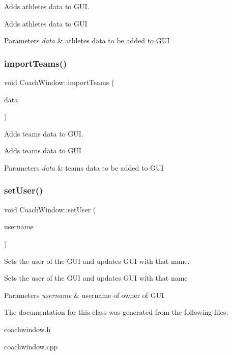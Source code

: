 Adds athletes data to G\+UI. 

Adds athletes data to G\+UI 
\begin{DoxyParams}{Parameters}
{\em data} & athletes data to be added to G\+UI \\
\hline
\end{DoxyParams}
\mbox{\label{classCoachWindow_af20eff5e696065c76f801f1aacea6322}} 
\subsubsection{\texorpdfstring{importTeams()}{importTeams()}}
{\footnotesize\ttfamily void Coach\+Window\+::import\+Teams (\begin{DoxyParamCaption}\item[{\mbox{\hyperlink{classTeamsDataContainer}{Teams\+Data\+Container}}}]{data }\end{DoxyParamCaption})}



Adds teams data to G\+UI. 

Adds teams data to G\+UI 
\begin{DoxyParams}{Parameters}
{\em data} & teams data to be added to G\+UI \\
\hline
\end{DoxyParams}
\mbox{\label{classCoachWindow_ac711fc6e1ae0ec1f53331faa6f3e2918}} 
\subsubsection{\texorpdfstring{setUser()}{setUser()}}
{\footnotesize\ttfamily void Coach\+Window\+::set\+User (\begin{DoxyParamCaption}\item[{std\+::string}]{username }\end{DoxyParamCaption})}



Sets the user of the G\+UI and updates G\+UI with that name. 

Sets the user of the G\+UI and updates G\+UI with that name 
\begin{DoxyParams}{Parameters}
{\em username} & username of owner of G\+UI \\
\hline
\end{DoxyParams}


The documentation for this class was generated from the following files\+:\begin{DoxyCompactItemize}
\item 
coachwindow.\+h\item 
coachwindow.\+cpp\end{DoxyCompactItemize}

